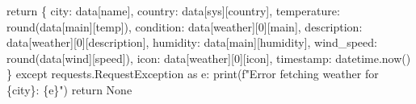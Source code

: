 \documentclass[
  letterpaper,
  DIV=11,
  numbers=noendperiod,
  oneside]{scrreprt}
\newenvironment{Shaded}{}{}
\newcommand{\BuiltInTok}[1]{\textcolor[rgb]{0.84,0.23,0.29}{#1}}
\newcommand{\ControlFlowTok}[1]{\textcolor[rgb]{0.84,0.23,0.29}{#1}}
\newcommand{\DecValTok}[1]{\textcolor[rgb]{0.00,0.36,0.77}{#1}}
\newcommand{\ImportTok}[1]{\textcolor[rgb]{0.01,0.18,0.38}{#1}}
\newcommand{\NormalTok}[1]{\textcolor[rgb]{0.14,0.16,0.18}{#1}}
\newcommand{\SpecialCharTok}[1]{\textcolor[rgb]{0.00,0.36,0.77}{#1}}
\newcommand{\SpecialStringTok}[1]{\textcolor[rgb]{0.01,0.18,0.38}{#1}}
\newcommand{\StringTok}[1]{\textcolor[rgb]{0.01,0.18,0.38}{#1}}
\newcommand{\VariableTok}[1]{\textcolor[rgb]{0.89,0.38,0.04}{#1}}
\begin{document}
\begin{Shaded}
\begin{Highlighting}[]
            \ControlFlowTok{return}\NormalTok{ \{}
                \StringTok{\textquotesingle{}city\textquotesingle{}}\NormalTok{: data[}\StringTok{\textquotesingle{}name\textquotesingle{}}\NormalTok{],}
                \StringTok{\textquotesingle{}country\textquotesingle{}}\NormalTok{: data[}\StringTok{\textquotesingle{}sys\textquotesingle{}}\NormalTok{][}\StringTok{\textquotesingle{}country\textquotesingle{}}\NormalTok{],}
                \StringTok{\textquotesingle{}temperature\textquotesingle{}}\NormalTok{: }\BuiltInTok{round}\NormalTok{(data[}\StringTok{\textquotesingle{}main\textquotesingle{}}\NormalTok{][}\StringTok{\textquotesingle{}temp\textquotesingle{}}\NormalTok{]),}
                \StringTok{\textquotesingle{}condition\textquotesingle{}}\NormalTok{: data[}\StringTok{\textquotesingle{}weather\textquotesingle{}}\NormalTok{][}\DecValTok{0}\NormalTok{][}\StringTok{\textquotesingle{}main\textquotesingle{}}\NormalTok{],}
                \StringTok{\textquotesingle{}description\textquotesingle{}}\NormalTok{: data[}\StringTok{\textquotesingle{}weather\textquotesingle{}}\NormalTok{][}\DecValTok{0}\NormalTok{][}\StringTok{\textquotesingle{}description\textquotesingle{}}\NormalTok{],}
                \StringTok{\textquotesingle{}humidity\textquotesingle{}}\NormalTok{: data[}\StringTok{\textquotesingle{}main\textquotesingle{}}\NormalTok{][}\StringTok{\textquotesingle{}humidity\textquotesingle{}}\NormalTok{],}
                \StringTok{\textquotesingle{}wind\_speed\textquotesingle{}}\NormalTok{: }\BuiltInTok{round}\NormalTok{(data[}\StringTok{\textquotesingle{}wind\textquotesingle{}}\NormalTok{][}\StringTok{\textquotesingle{}speed\textquotesingle{}}\NormalTok{]),}
                \StringTok{\textquotesingle{}icon\textquotesingle{}}\NormalTok{: data[}\StringTok{\textquotesingle{}weather\textquotesingle{}}\NormalTok{][}\DecValTok{0}\NormalTok{][}\StringTok{\textquotesingle{}icon\textquotesingle{}}\NormalTok{],}
                \StringTok{\textquotesingle{}timestamp\textquotesingle{}}\NormalTok{: datetime.now()}
\NormalTok{            \}}
        \ControlFlowTok{except}\NormalTok{ requests.RequestException }\ImportTok{as}\NormalTok{ e:}
            \BuiltInTok{print}\NormalTok{(}\SpecialStringTok{f"Error fetching weather for }\SpecialCharTok{\{}\NormalTok{city}\SpecialCharTok{\}}\SpecialStringTok{: }\SpecialCharTok{\{}\NormalTok{e}\SpecialCharTok{\}}\SpecialStringTok{"}\NormalTok{)}
            \ControlFlowTok{return} \VariableTok{None}
    

\end{Highlighting}
\end{Shaded}
\end{document}
